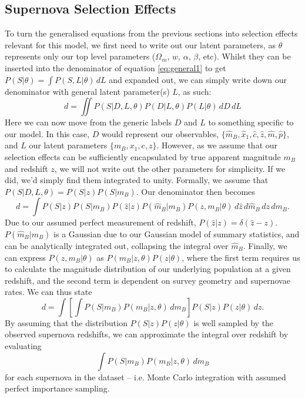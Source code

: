 \documentclass[a4paper,fleqn,usenatbib,manuscript]{emulateapj}
\newcommand{\blue}{\color{blue}}
\begin{document}
\subsection{Supernova Selection Effects}
\label{app:selection2}
{\blue
To turn the generalised equations from the previous sections into selection effects relevant for this model, we first need to write out our latent parameters, as $\theta$ represents only our top level parameters ($\Omega_m$, $w$, $\alpha$, $\beta$, etc). Whilst they can be inserted into the denominator of equation \eqref{eq:general1} to get $P(S|\theta) = \int P(S,L|\theta)\, dL$ and expanded out, we can simply write down our denominator with general latent parameter(s) $L$, as such:
\begin{equation}
d = \iint  P(S|D, L, \theta) P(D | L, \theta) P(L | \theta)\, dD\, dL
\end{equation}
Here we can now move from the generic labels $D$ and $L$ to something specific to our model. In this case, $D$ would represent our observables, $\lbrace \hat{m}_B, \hat{x}_1, \hat{c}, \hat{z}, \hat{m}, \hat{p}\rbrace$, and $L$ our latent parameters $\lbrace m_B, x_1, c, z\rbrace.$ However, as we assume that our selection effects can be sufficiently encapsulated by true apparent magnitude $m_B$ and redshift $z$, we will not write out the other parameters for simplicity. If we did, we'd simply find them integrated to unity. Formally, we assume that $P(S|D, L, \theta) = P(S|z) P(S|m_B)$.}
Our denominator then becomes
\begin{equation}
d = \int P(S|z) P(S|m_B) P(\hat{z}|z) P(\hat{m}_B|m_B) P(z, m_B | \theta)\, d\hat{z} \, d\hat{m}_B \, dz \, dm_B.  \label{eq:sel} 
\end{equation}
Due to our assumed perfect measurement of redshift, $P(\hat{z}|z) = \delta(\hat{z} - z)$. $P(\hat{m}_B | m_B)$ is a Gaussian due to our Gaussian model of summary statistics, and can be analytically integrated out, collapsing the integral over $\hat{m}_B$. Finally, we can express $P(z, m_B | \theta)$ as  $P(m_B | z, \theta) P(z | \theta)$, where the first term requires us to calculate the magnitude distribution of our underlying population at a given redshift, and the second term is dependent on survey geometry and supernovae rates. We can thus state
\begin{equation}
d = \int \left[ \int P(S|m_B) P(m_B | z, \theta)\, dm_B \right] P(S|z)P(z|\theta)\, dz.
\end{equation}
By assuming that the distribution $P(S|z)P(z|\theta)$ is well sampled by the observed supernova redshifts, we can approximate the integral over redshift by evaluating
\begin{equation}
\int P(S|m_B) P(m_B | z, \theta)\, dm_B \label{eq:selint}
\end{equation}
for each supernova in the dataset -- i.e. Monte Carlo integration with assumed perfect importance sampling.
\end{document}
